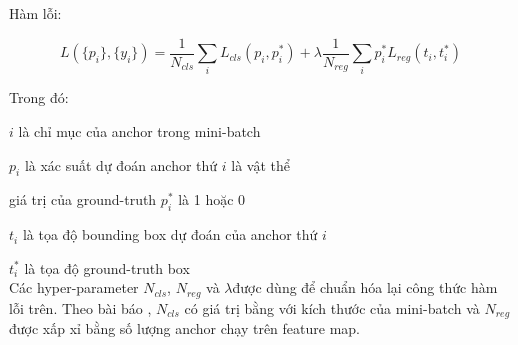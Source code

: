 Hàm lỗi:
\begin{center}
	\begin{equation}
		L(\{p_i\},\{y_i\}) = \frac{1}{N_{cls}}\sum_{i}L_{cls}(p_i, p_i^{*}) + \lambda \frac{1}{N_{reg}} \sum_{i}p_i^{*}L_{reg}(t_i, t_i^{*})
	\end{equation}
\end{center}
Trong đó:

$i$ là chỉ mục của anchor trong mini-batch

$p_i$ là xác suất dự đoán anchor thứ $i$ là vật thể

giá trị của ground-truth $p_i^*$ là 1 hoặc 0

$t_i$ là tọa độ bounding box dự đoán của anchor thứ $i$

$t_i^*$ là tọa độ ground-truth box
~\\
Các hyper-parameter $N_{cls}$, $N_{reg}$ và $\lambda$được dùng để chuẩn hóa lại công thức hàm lỗi trên. Theo bài báo \cite{ren2015faster}, $N_{cls}$ có giá trị bằng với kích thước của mini-batch và $N_{reg}$ được xấp xỉ bằng số lượng anchor chạy trên feature map.

